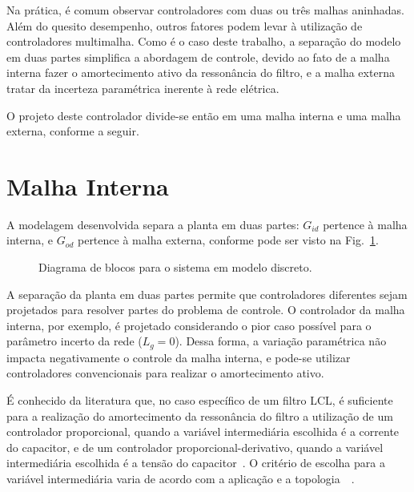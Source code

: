   Na prática, é comum observar controladores com duas ou três malhas aninhadas. Além do quesito desempenho, outros fatores podem levar à utilização de controladores multimalha. Como é o caso deste trabalho, a separação do modelo em duas partes simplifica a abordagem de controle, devido ao fato de a malha interna fazer o amortecimento ativo da ressonância do filtro, e a malha externa tratar da incerteza paramétrica inerente à rede elétrica.

  O projeto deste controlador divide-se então em uma malha interna e uma malha externa, conforme a seguir.

\section{Malha Interna}

  A modelagem desenvolvida separa a planta em duas partes: $G_{id}$ pertence à malha interna, e $G_{od}$ pertence à malha externa, conforme pode ser visto na Fig.~\ref{fig:sistema_discreto}.

  \begin{figure}[htb]
    \centering{
      \def\svgwidth{\textwidth}
      }
    \renewcommand\figurename{Fig.}
    \caption{Diagrama de blocos para o sistema em modelo discreto.}
    \label{fig:sistema_discreto}
  \end{figure}

  A separação da planta em duas partes permite que controladores diferentes sejam projetados para resolver partes do problema de controle. O controlador da malha interna, por exemplo, é projetado considerando o pior caso possível para o parâmetro incerto da rede ($L_g=0$). Dessa forma, a variação paramétrica não impacta negativamente o controle da malha interna, e pode-se utilizar controladores convencionais para realizar o amortecimento ativo.

  É conhecido da literatura que, no caso específico de um filtro LCL, é suficiente para a realização do amortecimento da ressonância do filtro a utilização de um controlador proporcional, quando a variável intermediária escolhida é a corrente do capacitor, e de um controlador proporcional-derivativo, quando a variável intermediária escolhida é a tensão do capacitor~\cite{ref:DANNEHL}. O critério de escolha para a variável intermediária varia de acordo com a aplicação e a topologia~\cite{ref:POH}~\cite{ref:IECON_2013}.

